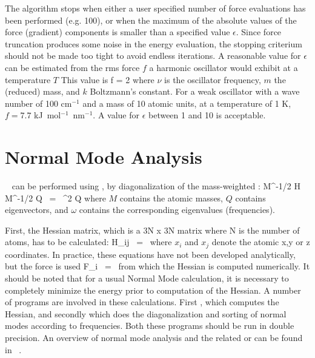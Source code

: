 The algorithm stops when either a user specified number of force 
evaluations has been performed (e.g. 100), or when the maximum of the absolute
values of the force (gradient) components is smaller than a specified
value $\epsilon$.
Since force truncation produces some noise in the
energy evaluation, the stopping criterium should not be made too tight
to avoid endless iterations. A reasonable value for $\epsilon$ can be
estimated from the rms force $f$ a harmonic oscillator would exhibit at a
temperature $T$ This value is 
\beq
  f = 2 \pi \nu {}
\eeq
where $\nu$ is the oscillator frequency, $m$ the (reduced) mass, and
$k$ Boltzmann's constant. For a weak oscillator with a wave number of
100 cm$^{-1}$ and a mass of 10 atomic units, at a temperature of 1 K,
$f=7.7$ kJ~mol$^{-1}$~nm$^{-1}$. A value for $\epsilon$ between 1 and
10 is acceptable.   


\section{Normal Mode Analysis}
~\cite{Levitt83,Go83,BBrooks83b} 
can be performed using {\gromacs}, by diagonalization of the mass-weighted
:
\beq
M^{-1/2} H M^{-1/2} Q	~=~	\omega^2 Q
\eeq
where $M$ contains the atomic masses, $Q$ contains eigenvectors, and $\omega$
contains the corresponding eigenvalues (frequencies).

First, the Hessian matrix, which is a 3N x 3N matrix where N is the number
of atoms, has to be calculated:
\beq
H_{ij}	~=~	
\eeq
where $x_i$ and $x_j$ denote the atomic x,y or z coordinates.
In practice, these equations have not been developed analytically, but
the force is used
\beq
F_i	~=~	
\eeq
from which the Hessian is computed numerically. It should be noted that
for a usual Normal Mode calculation, it is necessary to completely minimize 
the energy prior to computation
of the Hessian. A number of {\gromacs} programs are involved in these
calculations. First , which computes the Hessian,
and secondly  which does the diagonalization and
sorting of normal modes according to frequencies. Both these programs
should be run in double precision. An overview of normal mode analysis
and the related  or
 can be found in ~\cite{Hayward95b}.


